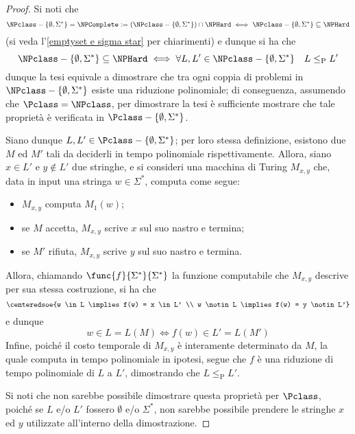 \documentclass[a4paper, 12pt]{report}
\begin{document}
    \begin{proof}
        Si noti che $$\NPclass - \{\emptyset, \Sigma^*\} = \NPComplete := (\NPclass - \{\emptyset, \Sigma^*\}) \cap \NPHard \iff \NPclass - \{\emptyset, \Sigma^*\} \subseteq \NPHard$$ (si veda l'\cref{emptyset e sigma star} per chiarimenti) e dunque si ha che $$\NPclass - \{\emptyset, \Sigma^*\} \subseteq \NPHard \iff \forall L, L' \in \NPclass - \{\emptyset, \Sigma^*\} \quad L \leq_\mathrm P L'$$ dunque la tesi equivale a dimostrare che tra ogni coppia di problemi in $\NPclass- \{ \emptyset, \Sigma^* \}$ esiste una riduzione polinomiale; di conseguenza, assumendo che $\Pclass = \NPclass$, per dimostrare la tesi è sufficiente mostrare che tale proprietà è verificata in $\Pclass - \{\emptyset, \Sigma^*\}$.

        Siano dunque $L, L' \in \Pclass - \{\emptyset, \Sigma^*\}$; per loro stessa definizione, esistono due \TM $M$ ed $M'$ tali da deciderli in tempo polinomiale rispettivamente. Allora, siano $x \in L'$ e $y \notin L'$ due stringhe, e si consideri una macchina di Turing $M_{x, y}$ che, data in input una stringa $w \in \Sigma^*$, computa come segue:
        
        \begin{itemize}
            \item $M_{x, y}$ computa $M_1(w)$;
            \item se $M$ accetta, $M_{x, y}$ scrive $x$ sul suo nastro e termina;
            \item se $M'$ rifiuta, $M_{x, y}$ scrive $y$ sul suo nastro e termina.
        \end{itemize}

        Allora, chiamando $\func{f}{\Sigma^*}{\Sigma^*}$ la funzione computabile che $M_{x, y}$ descrive per sua stessa costruzione, si ha che $$\centeredsoe{w \in L \implies f(w) = x \in L' \\ w \notin L \implies f(w) = y \notin L'}$$ e dunque $$w \in L = L(M) \iff f(w) \in L' = L(M')$$ Infine, poiché il costo temporale di $M_{x, y}$ è interamente determinato da $M$, la quale computa in tempo polinomiale in ipotesi, segue che $f$ è una riduzione di tempo polinomiale di $L$ a $L'$, dimostrando che $L \leq_\mathrm P L'$.

        Si noti che non sarebbe possibile dimostrare questa proprietà per $\Pclass$, poiché se $L$ e/o $L'$ fossero $\emptyset$ e/o $\Sigma^*$, non sarebbe possibile prendere le stringhe $x$ ed $y$ utilizzate all'interno della dimostrazione.
    \end{proof}
\end{document}

